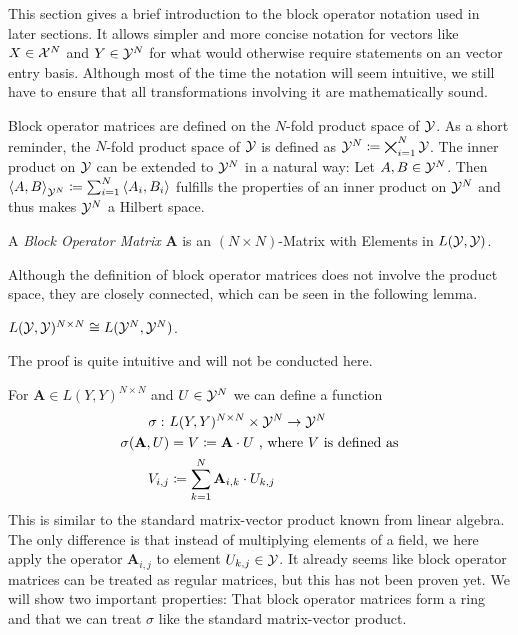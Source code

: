 This section gives a brief introduction to the block operator notation used in later sections.
It allows simpler and more concise notation for vectors like $X \in \mathcal{X}^N$ and $Y \in \mathcal{Y}^N$ for what would otherwise require statements on an vector entry basis.
Although most of the time the notation will seem intuitive, we still have to ensure that all transformations involving it are mathematically sound.

Block operator matrices are defined on the $N$-fold product space of $\mathcal{Y}$.
As a short reminder, the $N$-fold product space of $\mathcal{Y}$ is defined as $\mathcal{Y}^N \coloneqq \bigtimes_{i=1}^N \mathcal{Y}$.
The inner product on $\mathcal{Y}$ can be extended to $\mathcal{Y}^N$ in a natural way:
Let $A, B \in \mathcal{Y}^N$.
Then $\left < A, B \right >_{\mathcal{Y}^N} \coloneqq \sum_{i=1}^{N} \left <A_i, B_i \right >$ fulfills the properties of an inner product on $\mathcal{Y}^N$ and thus makes $\mathcal{Y}^N$ a Hilbert space.

\begin{definition}
	A \emph{Block Operator Matrix} $\mathbf{A}$ is an $(N \times N)$-Matrix with Elements in $L(\mathcal{Y}, \mathcal{Y})$.
\end{definition}
Although the definition of block operator matrices does not involve the product space, they are closely connected, which can be seen in the following lemma.
\begin{lemma}
  $L(\mathcal{Y}, \mathcal{Y})^{N \times N} \cong L(\mathcal{Y}^N, \mathcal{Y}^N)$.
\end{lemma}
The proof is quite intuitive and will not be conducted here.

For $\mathbf{A} \in L(Y, Y)^{N\times N}$ and $U \in \mathcal{Y}^N$ we can define a function
\begin{align}
	\sigma:~&L(Y, Y)^{N\times N} \times \cY^N \rightarrow \cY^N \\
	\sigma(\mathbf{A}, U) & = V \coloneqq \mathbf{A} \cdot U\ \text{, where $V$ is defined as} \\
	V_{i, j} &\coloneqq \sum_{k = 1}^N \mathbf{A}_{i,k} \cdot U_{k, j} \\
\end{align}
This is similar to the standard matrix-vector product known from linear algebra.
The only difference is that instead of multiplying elements of a field, we here apply the operator $\mathbf{A}_{i, j}$ to element $U_{k, j} \in \mathcal{Y}$.
It already seems like block operator matrices can be treated as regular matrices, but this has not been proven yet.
We will show two important properties: That block operator matrices form a ring and that we can treat $\sigma$ like the standard matrix-vector product.

